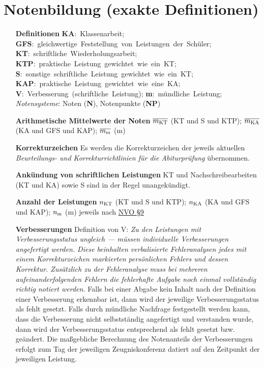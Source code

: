 \section{Notenbildung (exakte Definitionen)}

\begin{enumerate}[label=\textbf{\textbullet}, align=left, leftmargin=*]
	\item[\textbf{Definitionen}] { \scriptsize \mbox{\textbf{KA}: Klassenarbeit}; \mbox{\textbf{GFS}: gleichwertige Feststellung von Leistungen der Schüler}; \mbox{\textbf{KT}: schriftliche Wiederholungsarbeit};  \linebreak \mbox{\textbf{KTP}: praktische Leistung gewichtet wie ein KT}; \mbox{\textbf{S}: sonstige schriftliche Leistung gewichtet wie ein KT}; \mbox{\textbf{KAP}: praktische Leistung gewichtet wie eine KA}; \linebreak \mbox{\textbf{V}: Verbesserung (schriftliche Leistung)};  \mbox{\textbf{m}: mündliche Leistung}; \textit{Notensysteme}: Noten (\textbf{N}), Notenpunkte (\textbf{NP}) }
	\item[\textbf{Arithmetische Mittelwerte der Noten}]  { \scriptsize $\overline{m_{\mathrm{KT}}}$ (KT und S und KTP); $\overline{m_{\mathrm{KA}}}$ (KA und GFS und KAP); $\overline{m_{\mathrm{m}}}$ (m) }
	\item[\textbf{Korrekturzeichen}] { \scriptsize  Es werden die Korrekturzeichen der jeweils aktuellen \textit{\glqq Beurteilungs- und Korrekturrichtlinien für die Abiturprüfung\grqq{}} übernommen. }
	\item[\textbf{Ankündung von schriftlichen Leistungen}] { \scriptsize KT und Nachschreibearbeiten (KT und KA) sowie S sind in der Regel unangekündigt.}
	\item[\textbf{Anzahl der Leistungen}] { \scriptsize $n_{\mathrm{KT}}$ (KT und S und KTP); $n_{\mathrm{KA}}$ (KA und GFS und KAP); $n_{\mathrm{m}}$ (m) jeweils nach \href{\nvourl}{NVO §9}}
	\item[\textbf{Verbesserungen}] { \scriptsize Definition von V: \glqq\textit{Zu den Leistungen mit Verbesserungsstatus ungleich \glqq ---\grqq{} müssen \textit{individuelle} Verbesserungen angefertigt werden. Diese beinhalten verbalisierte Fehleranalysen jedes mit einem Korrekturzeichen markierten \textit{persönlichen} Fehlers und dessen Korrektur. Zusätzlich zu der Fehleranalyse muss bei mehreren aufeinanderfolgenden Fehlern die fehlerhafte Aufgabe noch einmal vollständig richtig notiert werden.}\grqq{} Falls bei einer Abgabe kein Inhalt nach der Definition einer Verbesserung erkennbar ist, dann wird der jeweilige Verbesserungsstatus als \glqq fehlt\grqq{} gesetzt.  Falls durch mündliche Nachfrage festgestellt werden kann, dass die Verbesserung nicht selbstständig angefertigt und verstanden wurde, dann wird der Verbesserungsstatus entsprechend als \glqq fehlt\grqq{} gesetzt bzw. geändert. Die maßgebliche Berechnung des Notenanteils der Verbesserungen erfolgt zum Tag der jeweiligen Zeugniskonferenz datiert auf den Zeitpunkt der jeweiligen Leistung.}

\end{enumerate}
